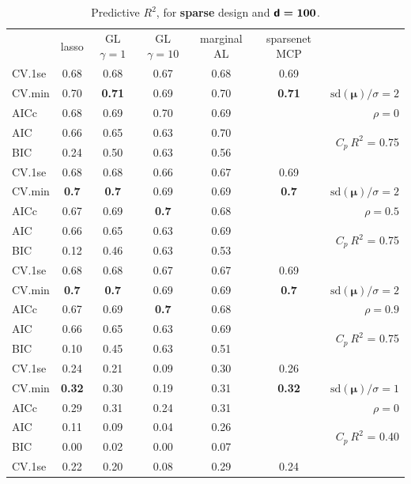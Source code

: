 \documentclass[12pt]{article}
\newcommand{\mr}[1]{\mathrm{#1}}
\newcommand{\bm}[1]{\mathbf{#1}}
\begin{document}
\begin{table}[p]\vspace{-.5cm}
\caption[l]{ Predictive $R^2$, for {\bf sparse} design and  $\boldsymbol{{\sf d}=100}$.}
\vspace{-.5cm}
\small{}
\begin{center}
\begin{tabular}{l*{5}{c}|r}
 & lasso & GL $\gamma=1$ & GL $\gamma=10$ & marginal AL & sparsenet MCP  &  \\
\cline{1-7}
CV.1se & 0.68 & 0.68 & 0.67 & 0.68 & 0.69 &\\
CV.min & 0.70 & {\bf 0.71} & 0.69 & 0.70 & {\bf 0.71} &  $\mr{sd}(\bm{\mu})/\sigma=2$ \\
AICc & 0.68 & 0.69 & 0.70 & 0.69 & & $\rho=0$ \\
AIC & 0.66 & 0.65 & 0.63 & 0.70 & & \multirow{2}{*}{$C_p ~ R^2$ = 0.75} \\
BIC & 0.24 & 0.50 & 0.63 & 0.56 & & \\
 \hline 
CV.1se & 0.68 & 0.68 & 0.66 & 0.67 & 0.69 &\\
CV.min & {\bf 0.7} & {\bf 0.7} & 0.69 & 0.69 & {\bf 0.7} &  $\mr{sd}(\bm{\mu})/\sigma=2$ \\
AICc & 0.67 & 0.69 & {\bf 0.7} & 0.68 & & $\rho=0.5$ \\
AIC & 0.66 & 0.65 & 0.63 & 0.69 & & \multirow{2}{*}{$C_p ~ R^2$ = 0.75} \\
BIC & 0.12 & 0.46 & 0.63 & 0.53 & & \\
 \hline 
CV.1se & 0.68 & 0.68 & 0.67 & 0.67 & 0.69 &\\
CV.min & {\bf 0.7} & {\bf 0.7} & 0.69 & 0.69 & {\bf 0.7} &  $\mr{sd}(\bm{\mu})/\sigma=2$ \\
AICc & 0.67 & 0.69 & {\bf 0.7} & 0.68 & & $\rho=0.9$ \\
AIC & 0.66 & 0.65 & 0.63 & 0.69 & & \multirow{2}{*}{$C_p ~ R^2$ = 0.75} \\
BIC & 0.10 & 0.45 & 0.63 & 0.51 & & \\
 \hline 
CV.1se & 0.24 & 0.21 & 0.09 & 0.30 & 0.26 &\\
CV.min & {\bf 0.32} & 0.30 & 0.19 & 0.31 & {\bf 0.32} &  $\mr{sd}(\bm{\mu})/\sigma=1$ \\
AICc & 0.29 & 0.31 & 0.24 & 0.31 & & $\rho=0$ \\
AIC & 0.11 & 0.09 & 0.04 & 0.26 & & \multirow{2}{*}{$C_p ~ R^2$ = 0.40} \\
BIC & 0.00 & 0.02 & 0.00 & 0.07 & & \\
 \hline 
CV.1se & 0.22 & 0.20 & 0.08 & 0.29 & 0.24 &\\

\end{tabular}
\end{center}
\end{table}
\end{document}
